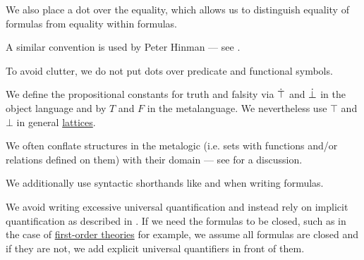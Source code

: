 \begin{remark}
\begin{thmenum}
    We also place a dot over the equality, which allows us to distinguish equality of formulas from equality within formulas.

    A similar convention is used by Peter Hinman --- see \cite[rem. 2.1.3]{Hinman2005}.

    To avoid clutter, we do not put dots over predicate and functional symbols.

     We define the propositional constants for truth and falsity via \( \dot\top \) and \( \dot\bot \) in the object language and by \( T \) and \( F \) in the metalanguage. We nevertheless use \( \top \) and \( \bot \) in general \hyperref[def:lattice]{lattices}.

     We often conflate structures in the metalogic (i.e. sets with functions and/or relations defined on them) with their domain --- see  for a discussion.

     We additionally use syntactic shorthands like  and  when writing formulas.

     We avoid writing excessive universal quantification and instead rely on implicit quantification as described in . If we need the formulas to be closed, such as in the case of \hyperref[def:first_order_theory]{first-order theories} for example, we assume all formulas are closed and if they are not, we add explicit universal quantifiers in front of them.
  \end{thmenum}
\end{remark}

